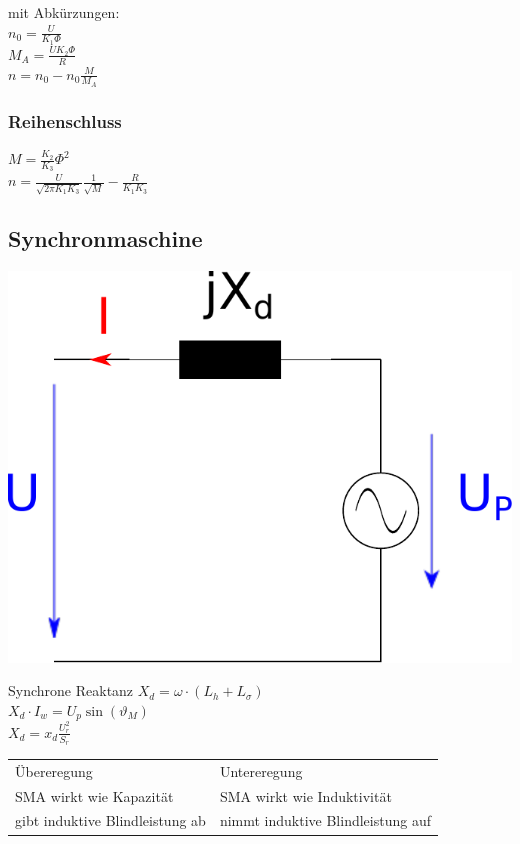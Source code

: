 \documentclass[fs, footer]{latex4ei}
\begin{document}
\begin{multicols}{4}
    mit Abkürzungen: \\
    $n_0 = \frac{U}{K_1 \Phi}$ \\
    $M_A = \frac{U K_2 \Phi}{R}$ \\
    $n = n_0 - n_0 \frac{M}{M_A}$


    \subsubsection{Reihenschluss}
    $M = \frac{K_2}{K_3} \Phi^2$ \\
    $n = \frac{U}{\sqrt{2 \pi K_1 K_3}} \frac{1}{\sqrt{M}} - \frac{R}{K_1 K_3}$


    \subsection{Synchronmaschine}

    \begin{center}
        \includegraphics[scale=.2]{./img/ersatzschaltbild_synchronmaschine.pdf}
    \end{center}

    Synchrone Reaktanz $X_d = \omega \cdot (L_h + L_\sigma)$\\
    $X_d \cdot I_w = U_p \sin(\vartheta_M)$\\
    $X_d = x_d \frac{U_r^2}{S_r}$ \\
    \begin{tabular}{ll}
        Übereregung                     & Untereregung                      \\ \mrule
        SMA wirkt wie Kapazität         & SMA wirkt wie Induktivität        \\
        gibt induktive Blindleistung ab & nimmt induktive Blindleistung auf \\
    \end{tabular}


\end{multicols}
\end{document}
